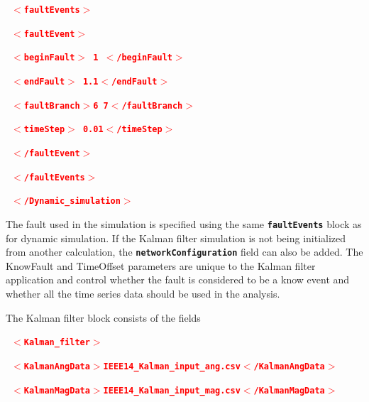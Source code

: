 \documentclass[12pt]{report} %
\begin{document}
\textcolor{red}{\texttt{\textbf{    $\boldsymbol{\mathrm{<}}$faultEvents$\boldsymbol{\mathrm{>}}$}}}

\textcolor{red}{\texttt{\textbf{      $\boldsymbol{\mathrm{<}}$faultEvent$\boldsymbol{\mathrm{>}}$}}}

\textcolor{red}{\texttt{\textbf{        $\boldsymbol{\mathrm{<}}$beginFault$\boldsymbol{\mathrm{>}}$ 1 $\boldsymbol{\mathrm{<}}$/beginFault$\boldsymbol{\mathrm{>}}$}}}

\textcolor{red}{\texttt{\textbf{        $\boldsymbol{\mathrm{<}}$endFault$\boldsymbol{\mathrm{>}}$   1.1$\boldsymbol{\mathrm{<}}$/endFault$\boldsymbol{\mathrm{>}}$}}}

\textcolor{red}{\texttt{\textbf{        $\boldsymbol{\mathrm{<}}$faultBranch$\boldsymbol{\mathrm{>}}$6 7$\boldsymbol{\mathrm{<}}$/faultBranch$\boldsymbol{\mathrm{>}}$}}}

\textcolor{red}{\texttt{\textbf{        $\boldsymbol{\mathrm{<}}$timeStep$\boldsymbol{\mathrm{>}}$   0.01$\boldsymbol{\mathrm{<}}$/timeStep$\boldsymbol{\mathrm{>}}$}}}

\textcolor{red}{\texttt{\textbf{      $\boldsymbol{\mathrm{<}}$/faultEvent$\boldsymbol{\mathrm{>}}$}}}

\textcolor{red}{\texttt{\textbf{    $\boldsymbol{\mathrm{<}}$/faultEvents$\boldsymbol{\mathrm{>}}$}}}

\textcolor{red}{\texttt{\textbf{  $\boldsymbol{\mathrm{<}}$/Dynamic\_simulation$\boldsymbol{\mathrm{>}}$}}}

The fault used in the simulation is specified using the same \texttt{\textbf{faultEvents}} block as for dynamic simulation. If the Kalman filter simulation is not being initialized from another calculation, the \texttt{\textbf{networkConfiguration}} field can also be added. The KnowFault and TimeOffset parameters are unique to the Kalman filter application and control whether the fault is considered to be a know event and whether all the time series data should be used in the analysis.

The Kalman filter block consists of the fields

\textcolor{red}{\texttt{\textbf{  $\boldsymbol{\mathrm{<}}$Kalman\_filter$\boldsymbol{\mathrm{>}}$}}}

\textcolor{red}{\texttt{\textbf{    $\boldsymbol{\mathrm{<}}$KalmanAngData$\boldsymbol{\mathrm{>}}$IEEE14\_Kalman\_input\_ang.csv$\boldsymbol{\mathrm{<}}$/KalmanAngData$\boldsymbol{\mathrm{>}}$}}}

\textcolor{red}{\texttt{\textbf{    $\boldsymbol{\mathrm{<}}$KalmanMagData$\boldsymbol{\mathrm{>}}$IEEE14\_Kalman\_input\_mag.csv$\boldsymbol{\mathrm{<}}$/KalmanMagData$\boldsymbol{\mathrm{>}}$}}}
\end{document}
